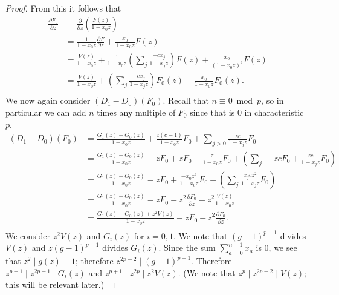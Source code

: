 \documentclass{article}
\numberwithin{equation}{section}
\begin{document}
\begin{proof}
From this it follows that
\begin{align*}
\frac{\partial F_0}{\partial z} &= \frac{\partial}{\partial z}\left(\frac{F(z)}{1-x_0z}\right)\\
&=\frac{1}{1-x_0z} \frac{\partial F}{\partial z}+\frac{x_0}{1-x_0z} F(z)\\
&=\frac{V(z)}{1-x_0z}+\frac{1}{1-x_0z}\left(\sum_j \frac{-cx_j}{1-x_jz}\right)F(z)+\frac{x_0}{(1-x_0z)^2} F(z)\\
&=\frac{V(z)}{1-x_0z}+\left(\sum_j \frac{-cx_j}{1-x_jz}\right)F_0(z)+\frac{x_0}{1-x_0z} F_0(z).\\
\end{align*}
We now again consider $(D_1-D_0)(F_0)$. Recall that $n \equiv 0 \bmod p$, so in particular we can add $n$ times any multiple of $F_0$ since that is $0$ in characteristic $p$. 
\begin{align*}
(D_1-D_0)(F_0)&=\frac{G_1(z)-G_0(z)}{1-x_0z}+\frac{z(c-1)}{1-x_0z}F_0+\sum_{j>0} \frac{zc}{1-x_jz}F_0\\
&=\frac{G_1(z)-G_0(z)}{1-x_0z}-zF_0+zF_0-\frac{z}{1-x_0z}F_0+\left(\sum_{j} -zcF_0+\frac{zc}{1-x_jz}F_0\right)\\
&=\frac{G_1(z)-G_0(z)}{1-x_0z}-zF_0+\frac{-x_0z^2}{1-x_0z}F_0+\left(\sum_{j} \frac{x_jcz^2}{1-x_jz}F_0\right)\\
&=\frac{G_1(z)-G_0(z)}{1-x_0z}-zF_0-z^2\frac{\partial F_0}{\partial z}+z^2\frac{V(z)}{1-x_0z}\\
&=\frac{G_1(z)-G_0(z)+z^2V(z)}{1-x_0z}-zF_0-z^2\frac{\partial F_0}{\partial z}.\\
\end{align*}
We consider $z^2V(z)$ and $G_i(z)$ for $i=0,1$. We note that $(g-1)^{p-1}$ divides $V(z)$ and $z(g-1)^{p-1}$ divides $G_i(z)$. Since the sum $\sum_{a=0}^{n-1} x_a$ is $0$, we see that $z^2 \mid g(z)-1$; therefore $z^{2p-2} \mid (g-1)^{p-1}$. Therefore $z^{p+1} \mid z^{2p-1} \mid G_i(z)$ and $z^{p+1} \mid z^{2p} \mid z^2V(z)$. (We note that $z^p \mid z^{2p-2} \mid V(z)$; this will be relevant later.)


\end{proof}
\end{document}
